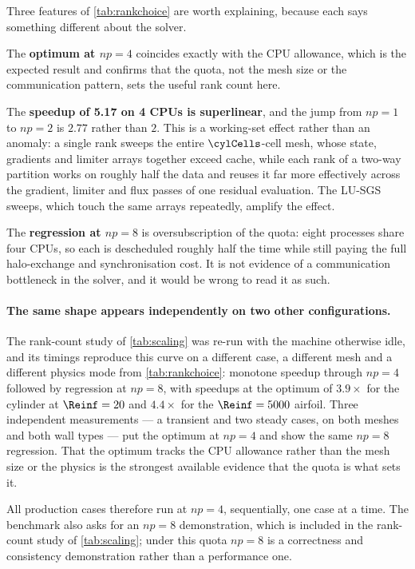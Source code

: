 Three features of \cref{tab:rankchoice} are worth explaining, because each says
something different about the solver.

The \textbf{optimum at $np=4$} coincides exactly with the CPU allowance, which is
the expected result and confirms that the quota, not the mesh size or the
communication pattern, sets the useful rank count here.

The \textbf{speedup of 5.17 on 4 CPUs is superlinear}, and the jump from $np=1$ to
$np=2$ is $2.77$ rather than $2$. This is a working-set effect rather than an
anomaly: a single rank sweeps the entire $\cylCells$-cell mesh, whose state,
gradients and limiter arrays together exceed cache, while each rank of a
two-way partition works on roughly half the data and reuses it far more
effectively across the gradient, limiter and flux passes of one residual
evaluation. The LU-SGS sweeps, which touch the same arrays repeatedly, amplify the
effect.

The \textbf{regression at $np=8$} is oversubscription of the quota: eight
processes share four CPUs, so each is descheduled roughly half the time while
still paying the full halo-exchange and synchronisation cost. It is not evidence
of a communication bottleneck in the solver, and it would be wrong to read it as
such.

\paragraph{The same shape appears independently on two other configurations.} The
rank-count study of \cref{tab:scaling} was re-run with the machine otherwise idle, and its
timings reproduce this curve on a different case, a different mesh and a different physics
mode from \cref{tab:rankchoice}: monotone speedup through $np=4$ followed by regression at
$np=8$, with speedups at the optimum of $3.9\times$ for the cylinder at $\Reinf=20$ and
$4.4\times$ for the $\Reinf=5000$ airfoil. Three independent measurements --- a transient
and two steady cases, on both meshes and both wall types --- put the optimum at $np=4$ and
show the same $np=8$ regression. That the optimum tracks the CPU allowance rather than the
mesh size or the physics is the strongest available evidence that the quota is what sets
it.

All production cases therefore run at $np=4$, sequentially, one case at a time.
The benchmark also asks for an $np=8$ demonstration, which is included in the
rank-count study of \cref{tab:scaling}; under this quota $np=8$ is a correctness
and consistency demonstration rather than a performance one.

